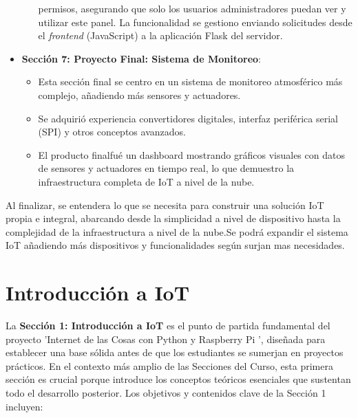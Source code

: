 \documentclass{report}
\begin{document}
\begin{itemize}
\begin{itemize}
        permisos, asegurando que solo los usuarios administradores puedan ver y utilizar este panel. La funcionalidad se gestiono 
        enviando solicitudes desde el \textit{frontend} (JavaScript) a la aplicación Flask del servidor.
    \end{itemize}
    \item \textbf{Sección 7: Proyecto Final: Sistema de Monitoreo}:
    \begin{itemize}
        \item Esta sección final se centro en un sistema de monitoreo atmosférico más complejo, añadiendo más sensores y actuadores.
        \item Se adquirió experiencia convertidores digitales, interfaz periférica serial (SPI) y otros conceptos avanzados.
        \item El producto finalfué un dashboard mostrando gráficos visuales con datos de sensores y actuadores en tiempo real, lo que 
        demuestro la infraestructura completa de IoT a nivel de la nube.
    \end{itemize}
\end{itemize}
Al finalizar, se entendera lo que se necesita para construir una solución IoT propia e integral, abarcando desde la simplicidad a nivel 
de dispositivo hasta la complejidad de la infraestructura a nivel de la nube.Se podrá expandir el sistema IoT añadiendo más dispositivos 
y funcionalidades según surjan mas necesidades.

\section{Introducción a IoT}
La \textbf{Sección 1: Introducción a IoT} es el punto de partida fundamental del proyecto  'Internet de las Cosas con Python y Raspberry Pi ', diseñada 
para establecer una base sólida antes de que los estudiantes se sumerjan en proyectos prácticos. En el contexto más amplio de las Secciones del Curso, 
esta primera sección es crucial porque introduce los conceptos teóricos esenciales que sustentan todo el desarrollo posterior. 
Los objetivos y contenidos clave de la Sección 1 incluyen:
\end{document}

